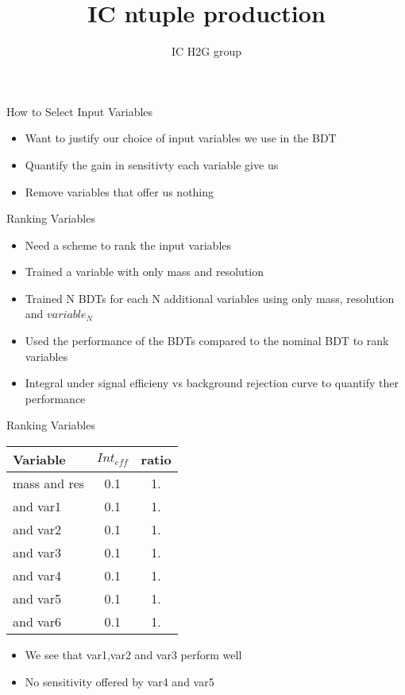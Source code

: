 \documentclass[t]{beamer}
\author{IC H2G group}
\title[IC ntuple production]{IC ntuple production}
\begin{document}


\begin{frame}{How to Select Input Variables}
  \begin{itemize}  
   \item Want to justify our choice of input variables we use in the BDT
   \item Quantify the gain in sensitivty each variable give us
   \item Remove variables that offer us nothing
   \end{itemize}
\end{frame}

\begin{frame}{Ranking Variables}
  \begin{itemize}  
   \item Need a scheme to rank the input variables
   \item Trained a variable with only mass and resolution
   \item Trained N BDTs for each N additional variables using only mass,
resolution and $variable_N$
   \item Used the performance of the BDTs compared to the nominal BDT to rank variables
   \item Integral under signal efficieny vs background rejection curve to
quantify ther performance
   \end{itemize}
\end{frame}


\begin{frame}{Ranking Variables}
  \begin{center}
    \begin{tabular}{| l | c c |} \hline
      Variable & $Int_{eff}$ & ratio \\ \hline
      mass and res & 0.1     & 1.    \\ \hline
      and var1     & 0.1     & 1.    \\
      and var2     & 0.1     & 1.    \\
      and var3     & 0.1     & 1.    \\
      and var4     & 0.1     & 1.    \\
      and var5     & 0.1     & 1.    \\
      and var6     & 0.1     & 1.    \\
      \hline
    \end{tabular}
  \end{center}
  \begin{itemize}  
    \item We see that var1,var2 and var3 perform well
    \item No sensitivity offered by var4 and var5
  \end{itemize}
\end{frame}
 
\end{document}
